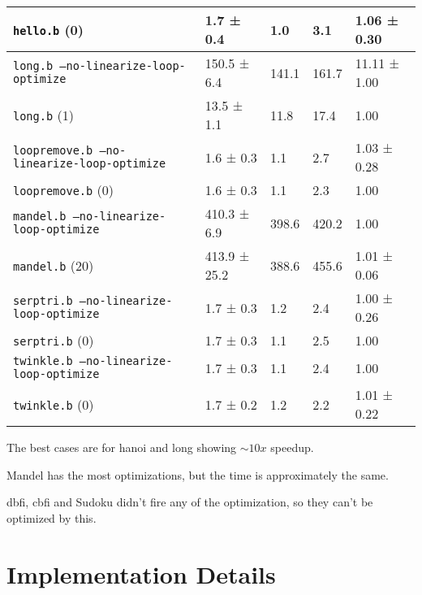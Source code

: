 \documentclass[11pt,answers]{exam}
\begin{document}
\begin{table}[H]
\begin{tabular}{|l|l|l|l|l|}
		\texttt{hello.b} (0)                                 & 1.7 ± 0.4          & 1.0               & 3.1               & 1.06 ± 0.30       \\ \hline
		\hline
		\texttt{long.b --no-linearize-loop-optimize}         & 150.5 ± 6.4        & 141.1             & 161.7             & 11.11 ± 1.00      \\ \hline
		\texttt{long.b} (1)                                  & 13.5 ± 1.1         & 11.8              & 17.4              & 1.00              \\ \hline
		\hline
		\texttt{loopremove.b --no-linearize-loop-optimize}   & 1.6 ± 0.3          & 1.1               & 2.7               & 1.03 ± 0.28       \\ \hline
		\texttt{loopremove.b} (0)                            & 1.6 ± 0.3          & 1.1               & 2.3               & 1.00              \\ \hline
		\hline
		\texttt{mandel.b --no-linearize-loop-optimize}       & 410.3 ± 6.9        & 398.6             & 420.2             & 1.00              \\ \hline
		\texttt{mandel.b} (20)                               & 413.9 ± 25.2       & 388.6             & 455.6             & 1.01 ± 0.06       \\
		\hline
		\texttt{serptri.b --no-linearize-loop-optimize}      & 1.7 ± 0.3          & 1.2               & 2.4               & 1.00 ± 0.26       \\ \hline
		\texttt{serptri.b} (0)                               & 1.7 ± 0.3          & 1.1               & 2.5               & 1.00              \\ \hline
		\hline
		\texttt{twinkle.b --no-linearize-loop-optimize}      & 1.7 ± 0.3          & 1.1               & 2.4               & 1.00              \\ \hline
		\texttt{twinkle.b} (0)                               & 1.7 ± 0.2          & 1.2               & 2.2               & 1.01 ± 0.22       \\ \hline
	\end{tabular}
\end{table}

The best cases are for hanoi and long showing $\sim10x$ speedup.

Mandel has the most optimizations, but the time is approximately the same.

dbfi, cbfi and Sudoku didn't fire any of the optimization, so they can't be optimized by this.

\section{Implementation Details}
\end{document}
